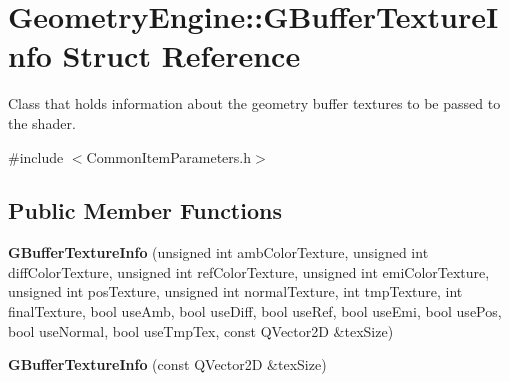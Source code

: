 \hypertarget{struct_geometry_engine_1_1_g_buffer_texture_info}{}\section{Geometry\+Engine\+::G\+Buffer\+Texture\+Info Struct Reference}
\label{struct_geometry_engine_1_1_g_buffer_texture_info}


Class that holds information about the geometry buffer textures to be passed to the shader.  




{\ttfamily \#include $<$Common\+Item\+Parameters.\+h$>$}

\subsection*{Public Member Functions}
\begin{DoxyCompactItemize}
\item 
\mbox{\label{struct_geometry_engine_1_1_g_buffer_texture_info_afbf90d9af515ea582a09e8378c65d5c3}} 
{\bfseries G\+Buffer\+Texture\+Info} (unsigned int amb\+Color\+Texture, unsigned int diff\+Color\+Texture, unsigned int ref\+Color\+Texture, unsigned int emi\+Color\+Texture, unsigned int pos\+Texture, unsigned int normal\+Texture, int tmp\+Texture, int final\+Texture, bool use\+Amb, bool use\+Diff, bool use\+Ref, bool use\+Emi, bool use\+Pos, bool use\+Normal, bool use\+Tmp\+Tex, const Q\+Vector2D \&tex\+Size)
\item 
\mbox{\label{struct_geometry_engine_1_1_g_buffer_texture_info_a813289a200b77f99e997e4fd74da9a73}} 
{\bfseries G\+Buffer\+Texture\+Info} (const Q\+Vector2D \&tex\+Size)
\end{DoxyCompactItemize}
